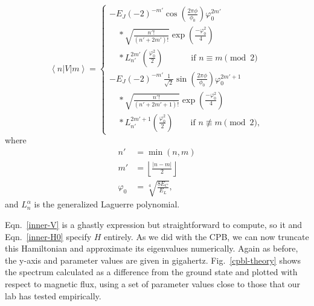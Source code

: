 \documentclass[twocolumn]{revtex4}
\newcommand{\innerp}[3]{\textstyle\left< #1 \left| #2 \right| #3 \right>}
\begin{document}
\begin{equation}
  \innerp{n}{V}{m} = \left\{\begin{array}{l}
      -E_J(-2)^{-m'}\cos\left(\frac{2\pi\phi}{\phi_0}\right)\varphi_0^{2m'}\\
      \quad{}*\sqrt{\frac{n'!}{(n'+2m')!}}
      \exp\left(\frac{-\varphi_0^2}{4}\right)\\
      \quad{}*L_{n'}^{2m'}\left(\frac{\varphi_0^2}{2}\right)
      \phantom{{}^{{}+1}}\qquad \text{if $n \equiv m \pmod{2}$}\\
      -E_J(-2)^{-m'}\frac{1}{\sqrt{2}}\sin
      \left(\frac{2\pi\phi}{\phi_0}\right)\varphi_0^{2m'+1}\\
      \quad{}*\sqrt{\frac{n'!}{(n'+2m'+1)!}}
      \exp\left(\frac{-\varphi_0^2}{4}\right)\\
      \quad{}*L_{n'}^{2m'+1}\left(\frac{\varphi_0^2}{2}\right)
      \qquad\text{if $n \not\equiv m \pmod{2}$},
\end{array}\right.
\label{inner-V}
\end{equation}
where
\begin{align}
  n'& =\min(n,m)\\
  m'&=\left\lfloor\frac{|n-m|}{2}\right\rfloor \\
  \varphi_0 &=\sqrt[4]{\frac{8E_C}{E_L}},
\end{align}
and $L_n^\alpha$ is the generalized Laguerre polynomial.

Eqn.~\ref{inner-V} is a ghastly expression but straightforward to
compute, so it and Eqn.~\ref{inner-H0} specify $H$ entirely. As we did
with the CPB, we can now truncate this Hamiltonian and approximate its
eigenvalues numerically. Again as before, the y-axis and parameter
values are given in gigahertz. Fig.~\ref{cpbl-theory} shows the
spectrum calculated as a difference from the ground state and plotted
with respect to magnetic flux, using a set of parameter values close
to those that our lab has tested empirically.
\end{document}
